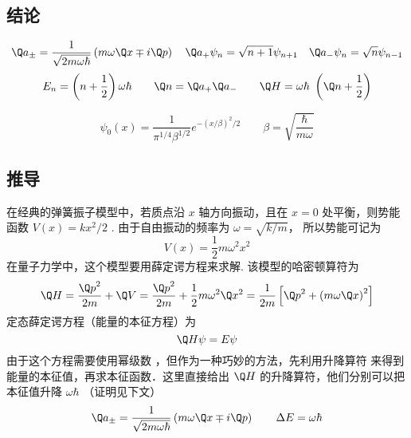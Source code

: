 
\subsection{结论}
\begin{equation}
{\Q a_ \pm } = \frac{1}{{\sqrt {2m\omega \hbar } }}\left( {m\omega \Q x \mp i\Q p} \right)
\quad
{\Q a_ + }{\psi _n} = \sqrt {n + 1}    {\psi _{n + 1}}
\quad
{\Q a_ - }{\psi _n} = \sqrt n    {\psi _{n - 1}}
\end{equation}
\begin{equation}
 {E_n} = \left( {n+\frac{1}{2} } \right)\omega \hbar
\qquad
\Q n = {\Q a_ + }{\Q a_ - }
\qquad
\Q H = \omega \hbar {\text{ }}\left( {\Q n + \frac{1}{2}} \right)
\end{equation}

\begin{equation}
\psi_0 (x) = \frac{1}{{{\pi ^{1/4}}{\beta ^{1/2}}}}{e^{ - {{(x/\beta )}^2}/2}}  \qquad \beta  = \sqrt {\frac{\hbar }{{m\omega }}}
\end{equation}

\subsection{推导}
在经典的弹簧振子模型中，若质点沿 $x$ 轴方向振动，且在 $x = 0$ 处平衡，则势能函数 $V\left( x \right) = k{x^2}/{2}$ . 由于自由振动的频率为 $\omega  = \sqrt {{k}/{m}} $， 所以势能可记为
\begin{equation}
  V\left( x \right) = \frac{1}{2}m{\omega ^2}{x^2}
\end{equation}
在量子力学中，这个模型要用薛定谔方程来求解. 该模型的哈密顿算符为
\begin{equation}
  \Q H = \frac{{{{\Q p}^2}}}{{2m}} + \Q V = \frac{{{{\Q p}^2}}}{{2m}} + \frac{1}{2}m{\omega ^2}{\Q x^2} = \frac{1}{{2m}}\left[ {{{\Q p}^2} + {{\left( {m\omega \Q x} \right)}^2}} \right]
\end{equation}
定态薛定谔方程（能量的本征方程）为
\begin{equation}\label{QSHOop_eq6}
  \Q H\psi  = E\psi
\end{equation}
由于这个方程需要使用幂级数%
，但作为一种巧妙的方法，先利用升降算符%
来得到能量的本征值，再求本征函数．这里直接给出 $\Q H$ 的升降算符，他们分别可以把本征值升降 $\omega\hbar$ （证明见下文）
\begin{equation}
{\Q a_ \pm } = \frac{1}{{\sqrt {2m\omega \hbar } }}\left( {m\omega \Q x \mp i\Q p} \right)
\qquad
\Delta E = \omega \hbar
\end{equation}

